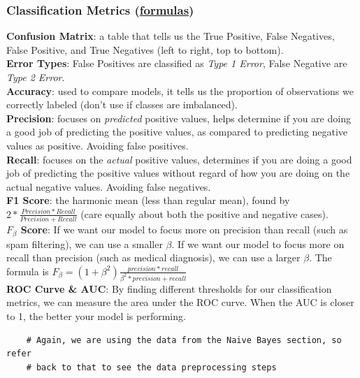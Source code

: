 \documentclass[11pt, a4paper]{article}
\begin{document}
\begin{spacing}{1.1}
	\subsubsection{Classification Metrics (\href{https://en.wikipedia.org/wiki/Precision\_and\_recall\#Definition\_(classification\_context)}{formulas})}
	\textbf{Confusion Matrix}: a table that tells us the True Positive, False Negatives, False Positive, and True Negatives (left to right, top to bottom).\vspace*{2mm}\\
	\textbf{Error Types}: False Positives are classified as \textit{Type 1 Error}, False Negative are \textit{Type 2 Error}.\vspace*{2mm}\\
	\textbf{Accuracy}: used to compare models, it tells us the proportion of observations we correctly labeled (don't use if classes are imbalanced).\vspace*{2mm}\\
	\textbf{Precision}: focuses on \textit{predicted} positive values, helps determine if you are doing a good job of predicting the positive values, as compared to predicting negative values as positive. Avoiding false positives.  \vspace*{2mm}\\
	\textbf{Recall}: focuses on the \textit{actual} positive values, determines if you are doing a good job of predicting the positive values without regard of how you are doing on the actual negative values. Avoiding false negatives. \vspace*{2mm}\\
	\textbf{F1 Score}: the harmonic mean (less than regular mean), found by $2*\frac{Precision*Recall}{Precision+Recall}$ (care equally about both the positive and negative cases). \vspace*{2mm}\\
	\textbf{$F_\beta$ Score}: If we want our model to focus more on precision than recall (such as spam filtering), we can use a smaller $\beta$. If we want our model to focus more on recall than precision (such as medical diagnosis), we can use a larger $\beta$. The formula is $F_\beta = (1+\beta^2) \frac{precision*recall}{\beta^2 * precision + recall}$\vspace*{2mm}\\
	\textbf{ROC Curve \& AUC}: By finding different thresholds for our classification metrics, we can measure the area under the ROC curve. When the AUC is closer to 1, the better your model is performing.
	\begin{lstlisting}
	# Again, we are using the data from the Naive Bayes section, so refer
	# back to that to see the data preprocessing steps
	

\end{lstlisting}
\end{spacing}
\end{document}

